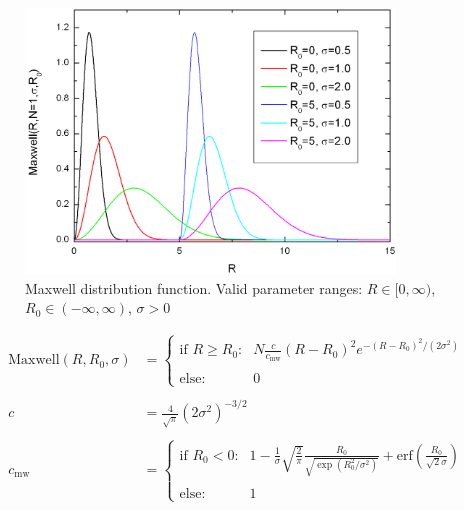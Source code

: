 \begin{figure}[htb]
\begin{center}
\includegraphics[width=0.874\textwidth,height=0.627\textwidth]{Maxwell.png}
\end{center}
\caption{Maxwell distribution function. Valid parameter ranges: $R
\in [0,\infty)$, $R_0\in (-\infty,\infty)$, $\sigma > 0$}
\label{fig:Maxwell}
\end{figure}
\begin{subequations}
\begin{align}
\text{Maxwell}(R,R_0,\sigma) &=
\begin{cases}
\text{if $R \geq R_0$:} &
N \frac{c}{c_\text{mw}} \left(R-R_0\right)^2 e^{-\left(R-R_0\right)^2/(2\sigma^2)}\\
& \\
\text{else:} & 0
\end{cases} \\
& \nonumber \\
c &= \frac{4}{\sqrt{\pi}} \left(2\sigma^2\right)^{-3/2}  \\
& \nonumber \\
c_\text{mw} &=
\begin{cases}
\text{if $R_0 < 0$:} & 1-\frac{1}{\sigma} \sqrt{\frac{2}{\pi}}
\frac{R_0}{\sqrt{\exp\left(R_0^2/\sigma^2\right)}} +
                  \text{erf}\left(\frac{R_0}{\sqrt{2}\sigma}\right)  \\
                  & \\
\text{else:} & 1
\end{cases}
\end{align}
\end{subequations}



